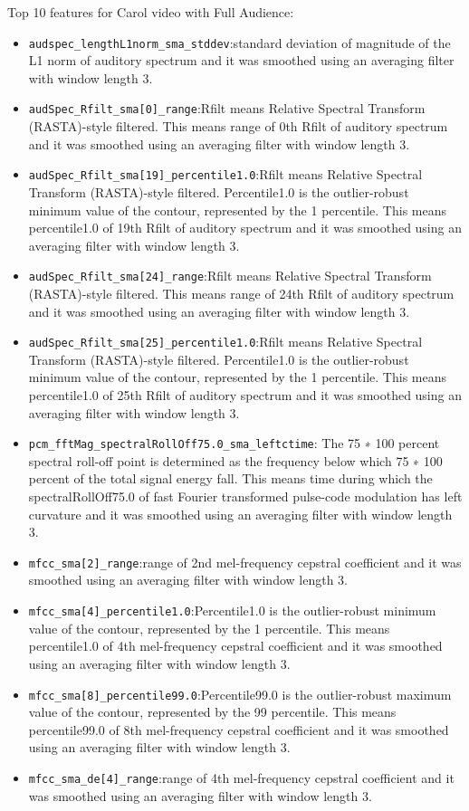 Top 10 features for Carol video with Full Audience:
\begin{itemize}
\item \verb|audspec_lengthL1norm_sma_stddev|:standard deviation of magnitude of the L1 norm of auditory spectrum and it was smoothed using an averaging filter with window length 3.
\item \verb|audSpec_Rfilt_sma[0]_range|:Rfilt means Relative Spectral Transform (RASTA)-style filtered. This means range of 0th Rfilt of auditory spectrum and it was smoothed using an averaging filter with window length 3.
\item \verb|audSpec_Rfilt_sma[19]_percentile1.0|:Rfilt means Relative Spectral Transform (RASTA)-style filtered. Percentile1.0 is the outlier-robust minimum value of the contour, represented by the 1 percentile. This means percentile1.0 of 19th Rfilt of auditory spectrum and it was smoothed using an averaging filter with window length 3.
\item \verb|audSpec_Rfilt_sma[24]_range|:Rfilt means Relative Spectral Transform (RASTA)-style filtered. This means range of 24th Rfilt of auditory spectrum and it was smoothed using an averaging filter with window length 3.
\item \verb|audSpec_Rfilt_sma[25]_percentile1.0|:Rfilt means Relative Spectral Transform (RASTA)-style filtered. Percentile1.0 is the outlier-robust minimum value of the contour, represented by the 1 percentile. This means percentile1.0 of 25th Rfilt of auditory spectrum and it was smoothed using an averaging filter with window length 3.
\item \verb|pcm_fftMag_spectralRollOff75.0_sma_leftctime|: The 75 ∗ 100 percent spectral roll-off point is determined as the frequency below which 75 ∗ 100 percent of the total signal energy fall. This means time during which the spectralRollOff75.0 of fast Fourier transformed pulse-code modulation has left curvature and it was smoothed using an averaging filter with window length 3.
\item \verb|mfcc_sma[2]_range|:range of 2nd mel-frequency cepstral coefficient and it was smoothed using an averaging filter with window length 3.
\item \verb|mfcc_sma[4]_percentile1.0|:Percentile1.0 is the outlier-robust minimum value of the contour, represented by the 1 percentile. This means percentile1.0 of 4th mel-frequency cepstral coefficient and it was smoothed using an averaging filter with window length 3.
\item \verb|mfcc_sma[8]_percentile99.0|:Percentile99.0 is the outlier-robust maximum value of the contour, represented by the 99 percentile. This means percentile99.0 of 8th mel-frequency cepstral coefficient and it was smoothed using an averaging filter with window length 3.
\item \verb|mfcc_sma_de[4]_range|:range of 4th mel-frequency cepstral coefficient and it was smoothed using an averaging filter with window length 3.
\end{itemize}

